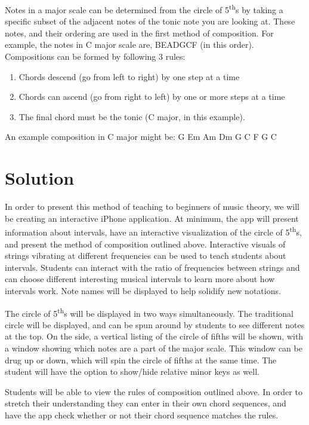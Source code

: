 \documentclass[onecolumn, draftclsnofoot,10pt, compsoc]{IEEEtran}
\begin{document}
\par
Notes in a major scale can be determined from the circle of 5\textsuperscript{th}s by taking a specific subset of the adjacent notes of the tonic note you are looking at. 
These notes, and their ordering are used in the first method of composition. For example, the notes in C major scale are, BEADGCF (in this order). 
Compositions can be formed by following 3 rules:

\begin{enumerate}
\item Chords descend (go from left to right) by one step at a time
\item Chords can ascend (go from right to left) by one or more steps at a time
\item The final chord must be the tonic (C major, in this example).
\end{enumerate}

An example composition in C major might be: G Em Am Dm G C F G C
\clearpage

\section{Solution}
In order to present this method of teaching to beginners of music theory, we will be creating an interactive iPhone application.
At minimum, the app will present information about intervals, have an interactive visualization of the circle of 5\textsuperscript{th}s, and present the method of composition outlined above.
Interactive visuals of strings vibrating at different frequencies can be used to teach students about intervals.
Students can interact with the ratio of frequencies between strings and can choose different interesting musical intervals to learn more about how intervals work.
Note names will be displayed to help solidify new notations.

\par
The circle of 5\textsuperscript{th}s will be displayed in two ways simultaneously.
The traditional circle will be displayed, and can be spun around by students to see different notes at the top.
On the side, a vertical listing of the circle of fifths will be shown, with a window showing which notes are a part of the major scale.
This window can be drug up or down, which will spin the circle of fifths at the same time.
The student will have the option to show/hide relative minor keys as well.

\par
Students will be able to view the rules of composition outlined above.
In order to stretch their understanding they can enter in their own chord sequences, and have the app check whether or not their chord sequence matches the rules.
\end{document}
